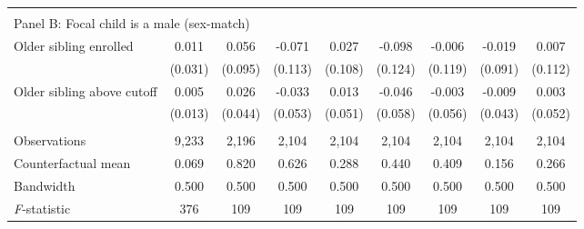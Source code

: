 {{\begin{tabular}{lcccccccc}
&  &  &  & & & & & \\
\multicolumn{10}{l}{Panel B: Focal child is a male (sex-match)} \\
Older sibling enrolled&       0.011   &       0.056   &      -0.071   &       0.027   &      -0.098   &      -0.006   &      -0.019   &       0.007   \\
                    &     (0.031)   &     (0.095)   &     (0.113)   &     (0.108)   &     (0.124)   &     (0.119)   &     (0.091)   &     (0.112)   \\
 
Older sibling above cutoff&       0.005   &       0.026   &      -0.033   &       0.013   &      -0.046   &      -0.003   &      -0.009   &       0.003   \\
                    &     (0.013)   &     (0.044)   &     (0.053)   &     (0.051)   &     (0.058)   &     (0.056)   &     (0.043)   &     (0.052)   \\
                    &               &               &               &               &               &               &               &               \\
Observations        &       9,233   &       2,196   &       2,104   &       2,104   &       2,104   &       2,104   &       2,104   &       2,104   \\
Counterfactual mean &       0.069   &       0.820   &       0.626   &       0.288   &       0.440   &       0.409   &       0.156   &       0.266   \\
Bandwidth           &       0.500   &       0.500   &       0.500   &       0.500   &       0.500   &       0.500   &       0.500   &       0.500   \\
\textit{F}-statistic&         376   &         109   &         109   &         109   &         109   &         109   &         109   &         109   \\
 

\bottomrule
\end{tabular}
}
}
